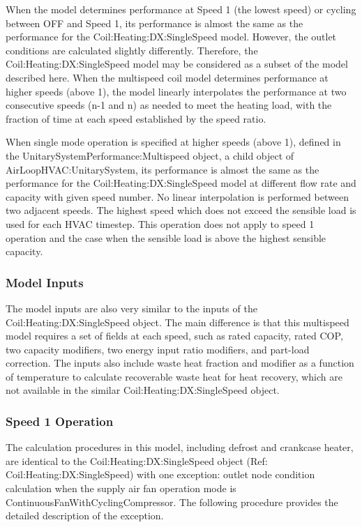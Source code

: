 When the model determines performance at Speed 1 (the lowest speed) or cycling between OFF and Speed 1, its performance is almost the same as the performance for the Coil:Heating:DX:SingleSpeed model. However, the outlet conditions are calculated slightly differently. Therefore, the Coil:Heating:DX:SingleSpeed model may be considered as a subset of the model described here. When the multispeed coil model determines performance at higher speeds (above 1), the model linearly interpolates the performance at two consecutive speeds (n-1 and n) as needed to meet the heating load, with the fraction of time at each speed established by the speed ratio.

When single mode operation is specified at higher speeds (above 1), defined in the UnitarySystemPerformance:Multispeed object, a child object of AirLoopHVAC:UnitarySystem, its performance is almost the same as the performance for the Coil:Heating:DX:SingleSpeed model at different flow rate and capacity with given speed number. No linear interpolation is performed between two adjacent speeds. The highest speed which does not exceed the sensible load is used for each HVAC timestep. This operation does not apply to speed 1 operation and the case when the sensible load is above the highest sensible capacity.

\subsubsection{Model Inputs}\label{model-inputs-3}

The model inputs are also very similar to the inputs of the Coil:Heating:DX:SingleSpeed object. The main difference is that this multispeed model requires a set of fields at each speed, such as rated capacity, rated COP, two capacity modifiers, two energy input ratio modifiers, and part-load correction. The inputs also include waste heat fraction and modifier as a function of temperature to calculate recoverable waste heat for heat recovery, which are not available in the similar Coil:Heating:DX:SingleSpeed object.

\subsubsection{Speed 1 Operation}\label{speed-1-operation-1}

The calculation procedures in this model, including defrost and crankcase heater, are identical to the Coil:Heating:DX:SingleSpeed object (Ref: Coil:Heating:DX:SingleSpeed) with one exception: outlet node condition calculation when the supply air fan operation mode is ContinuousFanWithCyclingCompressor. The following procedure provides the detailed description of the exception.

